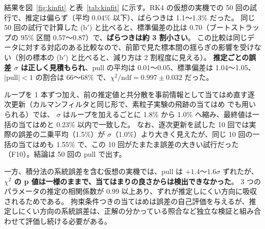 \documentclass[paper=a4paper,fontsize=10pt,twocolumn,column_gap=2zw,line_length=24zw,number_of_lines=46,head_space=20mm]{jlreq}
\begin{document}
\begin{table}[t]\centering\small
\caption{kinematic fit の自己評価（腕 / 脚 / 慣性）}\label{tab:kinfit}
\footnotesize\setlength{\tabcolsep}{2pt}
\end{table}

結果を図~\ref{fig:kinfit} と表~\ref{tab:kinfit} に示す。RK4 の仮想の実機での 50 回の試行で、推定は偏らず（平均 0.04\% 以下）、ばらつきは 1.1〜1.3\% だった。
同じ 50 回の試行で計算した (b$'$) と比べると、標準偏差の比は 0.70（ブートストラップの 95\% 区間 0.57〜0.87）で、\textbf{ばらつきは約 3 割小さい}。
この比較は同じデータに対する対応のある比較なので、前節で見た標本間の揺らぎの影響を受けない（別の標本の (b$'$) と比べると、減り方は 2 割程度に見える）。
\textbf{推定ごとの誤差 $\sigma$ は正しく見積もられ}、pull の平均は 0.01〜0.05、標準偏差は 1.04〜1.05、$|\text{pull}|<1$ の割合は 66〜68\% で、$\chi^2/\text{ndf}=0.997\pm0.032$ だった。

ループを 1 本ずつ加え、前の推定値と共分散を事前情報として当てはめ直す逐次更新（カルマンフィルタと同じ形で、素粒子実験の飛跡の当てはめ \cite{fruhwirth1987} でも用いられる）では、
$\sigma$ はループを加えるごとに 1.8\% から 1.0\% へ縮み、最終値は一括の当てはめと 0.23\% 以内で一致した。
なお、逐次更新を試した 10 回では実際の誤差の二乗平均（1.5\%）が $\sigma$（1.0\%）より大きく見えたが、同じ 10 回の一括の当てはめも 1.55\% で、この 10 回がたまたま誤差の大きい試行だった（F10）。結論は 50 回の pull で出す。

一方、積分法の系統誤差を含む仮想の実機では、pull は $+1.4$〜$1.6\sigma$ ずれたが、\textbf{$\chi^2$ の p 値は一様のままで、当てはまりの良さからは検出できなかった}。
3 つのパラメータの推定の相関係数が 0.99 以上あり、ずれが推定しにくい方向に吸収されるためである。
拘束条件つきの当てはめは誤差の自己評価を与えるが、推定しにくい方向の系統誤差は、正解の分かっている照合など独立な検証と組み合わせて評価し続ける必要がある。
\end{document}
